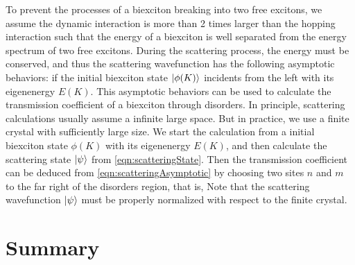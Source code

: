 To prevent the processes of a biexciton breaking into two free excitons, we assume the dynamic interaction is more
than 2 times larger than the hopping interaction such that the energy of a biexciton is well separated from the 
energy spectrum of two free excitons. 
During the scattering process, the energy must be conserved, and thus the
scattering wavefunction has the following asymptotic behaviors:
if the initial biexciton state $| \phi(K) \rangle$ incidents from the left with its eigenenergy $E(K)$. 
This asymptotic behaviors can be used to calculate the transmission coefficient of a biexciton through disorders. 
In principle, scattering calculations usually assume a infinite large space. But in practice, we use a finite crystal  
with sufficiently large size. We start the calculation from a initial biexciton state $\phi(K)$ with
its eigenenergy $E(K)$, and then calculate the scattering state $| \psi \rangle$ from \autoref{eqn:scatteringState}. 
Then the transmission coefficient can be deduced from \autoref{eqn:scatteringAsymptotic} by choosing two sites
$n$ and $m$ to the far right of the disorders region, that is, 
Note that the scattering wavefunction $| \psi \rangle$ must be properly normalized with respect to the finite crystal. 

\section{Summary}
\label{sec:summaryGreenFunc}

